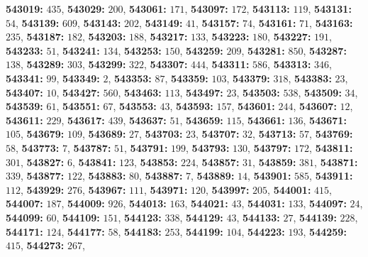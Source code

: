 \textsf{\bfseries 543019:} $435$, \textsf{\bfseries 543029:} $200$, \textsf{\bfseries 543061:} $171$, \textsf{\bfseries 543097:} $172$, \textsf{\bfseries 543113:} $119$, \textsf{\bfseries 543131:} $54$, \textsf{\bfseries 543139:} $609$, \textsf{\bfseries 543143:} $202$, \textsf{\bfseries 543149:} $41$, \textsf{\bfseries 543157:} $74$, \textsf{\bfseries 543161:} $71$, \textsf{\bfseries 543163:} $235$, \textsf{\bfseries 543187:} $182$, \textsf{\bfseries 543203:} $188$, \textsf{\bfseries 543217:} $133$, \textsf{\bfseries 543223:} $180$, \textsf{\bfseries 543227:} $191$, \textsf{\bfseries 543233:} $51$, \textsf{\bfseries 543241:} $134$, \textsf{\bfseries 543253:} $150$, \textsf{\bfseries 543259:} $209$, \textsf{\bfseries 543281:} $850$, \textsf{\bfseries 543287:} $138$, \textsf{\bfseries 543289:} $303$, \textsf{\bfseries 543299:} $322$, \textsf{\bfseries 543307:} $444$, \textsf{\bfseries 543311:} $586$, \textsf{\bfseries 543313:} $346$, \textsf{\bfseries 543341:} $99$, \textsf{\bfseries 543349:} $2$, \textsf{\bfseries 543353:} $87$, \textsf{\bfseries 543359:} $103$, \textsf{\bfseries 543379:} $318$, \textsf{\bfseries 543383:} $23$, \textsf{\bfseries 543407:} $10$, \textsf{\bfseries 543427:} $560$, \textsf{\bfseries 543463:} $113$, \textsf{\bfseries 543497:} $23$, \textsf{\bfseries 543503:} $538$, \textsf{\bfseries 543509:} $34$, \textsf{\bfseries 543539:} $61$, \textsf{\bfseries 543551:} $67$, \textsf{\bfseries 543553:} $43$, \textsf{\bfseries 543593:} $157$, \textsf{\bfseries 543601:} $244$, \textsf{\bfseries 543607:} $12$, \textsf{\bfseries 543611:} $229$, \textsf{\bfseries 543617:} $439$, \textsf{\bfseries 543637:} $51$, \textsf{\bfseries 543659:} $115$, \textsf{\bfseries 543661:} $136$, \textsf{\bfseries 543671:} $105$, \textsf{\bfseries 543679:} $109$, \textsf{\bfseries 543689:} $27$, \textsf{\bfseries 543703:} $23$, \textsf{\bfseries 543707:} $32$, \textsf{\bfseries 543713:} $57$, \textsf{\bfseries 543769:} $58$, \textsf{\bfseries 543773:} $7$, \textsf{\bfseries 543787:} $51$, \textsf{\bfseries 543791:} $199$, \textsf{\bfseries 543793:} $130$, \textsf{\bfseries 543797:} $172$, \textsf{\bfseries 543811:} $301$, \textsf{\bfseries 543827:} $6$, \textsf{\bfseries 543841:} $123$, \textsf{\bfseries 543853:} $224$, \textsf{\bfseries 543857:} $31$, \textsf{\bfseries 543859:} $381$, \textsf{\bfseries 543871:} $339$, \textsf{\bfseries 543877:} $122$, \textsf{\bfseries 543883:} $80$, \textsf{\bfseries 543887:} $7$, \textsf{\bfseries 543889:} $14$, \textsf{\bfseries 543901:} $585$, \textsf{\bfseries 543911:} $112$, \textsf{\bfseries 543929:} $276$, \textsf{\bfseries 543967:} $111$, \textsf{\bfseries 543971:} $120$, \textsf{\bfseries 543997:} $205$, \textsf{\bfseries 544001:} $415$, \textsf{\bfseries 544007:} $187$, \textsf{\bfseries 544009:} $926$, \textsf{\bfseries 544013:} $163$, \textsf{\bfseries 544021:} $43$, \textsf{\bfseries 544031:} $133$, \textsf{\bfseries 544097:} $24$, \textsf{\bfseries 544099:} $60$, \textsf{\bfseries 544109:} $151$, \textsf{\bfseries 544123:} $338$, \textsf{\bfseries 544129:} $43$, \textsf{\bfseries 544133:} $27$, \textsf{\bfseries 544139:} $228$, \textsf{\bfseries 544171:} $124$, \textsf{\bfseries 544177:} $58$, \textsf{\bfseries 544183:} $253$, \textsf{\bfseries 544199:} $104$, \textsf{\bfseries 544223:} $193$, \textsf{\bfseries 544259:} $415$, \textsf{\bfseries 544273:} $267$, 
